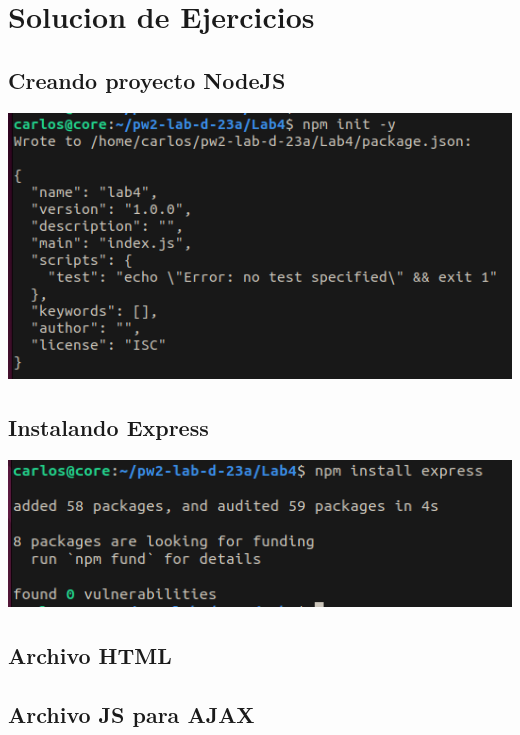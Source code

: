 \documentclass{article}
\begin{document}
\section{Solucion de Ejercicios}
\subsection{Creando proyecto NodeJS}
\begin{center}
    \includegraphics[scale=0.5]{img/init-nodejs.png}
\end{center}
\subsection{Instalando Express}
\begin{center}
    \includegraphics[scale=0.5]{img/express.png}
\end{center}

\subsection{Archivo HTML}


\subsection{Archivo JS para AJAX}

\end{document}
